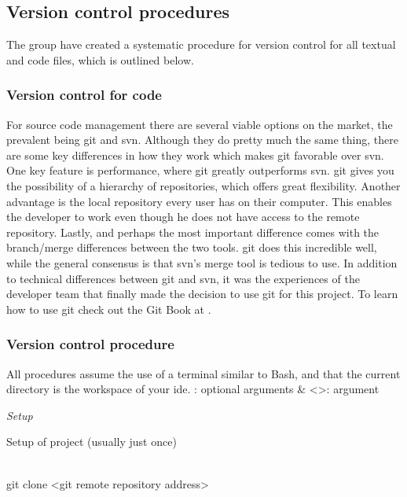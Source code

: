 

\subsection{Version control procedures}
The group have created a systematic procedure for version control for all textual and code files, which is outlined below.

\subsubsection{Version control for code}
For source code management there are several viable options on the market, the prevalent being \gls{git} and \gls{svn}. Although they do pretty much the same thing, there are some key differences in how they work which makes \gls{git} favorable over \gls{svn}. One key feature is performance, where \gls{git} greatly outperforms \gls{svn}. \gls{git} gives you the possibility of a hierarchy of repositories, which offers great flexibility. Another advantage is the local repository every user has on their computer. This enables the developer to work even though he does not have access to the remote repository. Lastly, and perhaps the most important difference comes with the branch/merge differences between the two tools. \gls{git} does this incredible well, while the general consensus is that \gls{svn}’s merge tool is tedious to use.  
\newline
\newline
In addition to technical differences between \gls{git} and \gls{svn}, it was the experiences of the developer team that finally made the decision to use \gls{git} for this project. To learn how to use \gls{git} check out the Git Book at \cite{bib:gitbook}.

\newpage

\subsubsection{Version control procedure}
All procedures assume the use of a terminal similar to Bash, and that the current directory is the workspace of your \gls{ide}.
\newline
\newline
[]: optional arguments \& <>: argument

\textit{Setup}
\begin{description}
	{\indentitem \item[Description:] Setup of project (usually just once)}
	{\indentitem \item[Command:] \hfill \\
	\hspace*{3em} git clone <git remote repository address>}
\end{description}

